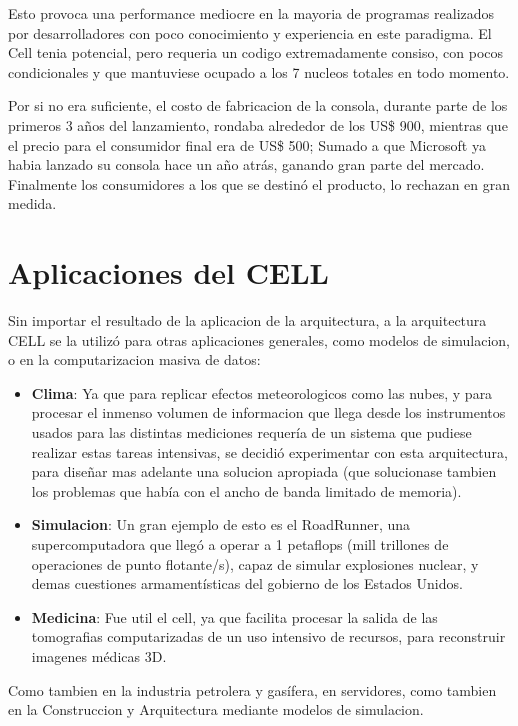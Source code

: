 \documentclass[10pt,compsoc]{IEEEtran}
\begin{document}
	 
		
	Esto provoca una performance mediocre en la mayoria de programas realizados por desarrolladores con poco conocimiento y experiencia en este paradigma. El Cell tenia potencial, pero requeria un codigo extremadamente consiso, con pocos condicionales y que mantuviese ocupado a los 7 nucleos totales en todo momento.\newline
	
	Por si no era suficiente, el costo de fabricacion de la consola, durante parte de los primeros 3 años del lanzamiento, rondaba alrededor de los US\$ 900, mientras que el precio para el consumidor final era de US\$ 500; Sumado a que Microsoft ya habia lanzado su consola hace un año atrás, ganando gran parte del mercado. Finalmente los consumidores a los que se destinó el producto, lo rechazan en gran medida.
	
	
	\section{Aplicaciones del CELL}
	\noindent Sin importar el resultado de la aplicacion de la arquitectura, a la arquitectura CELL se la utilizó para otras aplicaciones generales, como modelos de simulacion, o en la computarizacion masiva de datos:
	
	\begin{itemize}
		
		\item{{\bf{Clima}}: Ya que para replicar efectos meteorologicos como las nubes, y para procesar el inmenso volumen de informacion que llega desde los instrumentos usados para las distintas mediciones requería de un sistema que pudiese realizar estas tareas intensivas, se decidió experimentar con esta arquitectura, para diseñar mas adelante una solucion apropiada (que solucionase tambien los problemas que había con el ancho de banda limitado de memoria).}\newline
		
		\item{{\bf{Simulacion}}: Un gran ejemplo de esto es el RoadRunner, una supercomputadora que llegó a operar a 1 petaflops (mill trillones de operaciones de punto flotante/s), capaz de simular explosiones nuclear, y demas cuestiones armamentísticas del gobierno de los Estados Unidos.}\newline
		
		\item{{\bf{Medicina}}: Fue util el cell, ya que facilita procesar la salida de las tomografias computarizadas de un uso intensivo de recursos, para reconstruir imagenes médicas 3D.}

	\end{itemize}
	Como tambien en la industria petrolera y gasífera, en servidores, como tambien en la Construccion y Arquitectura mediante modelos de simulacion.
	
\end{document}
